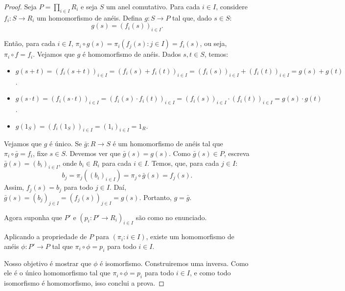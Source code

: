 \begin{proof}
    Seja $P=\prod_{i \in I}R_i$ e seja $S$ um anel comutativo. Para cada $i \in I$, considere $f_i:S\rightarrow R_i$ um homomorfismo de anéis.
    Defina $g:S\rightarrow P$ tal que, dado $s \in S$:
    \[g(s)=(f_i(s))_{i \in I}.\]

    Então, para cada $i \in I$, $\pi_i\circ g(s)=\pi_i(f_j(s): j \in I)=f_i(s)$, ou seja, $\pi_i\circ f=f_i$.
    Vejamos que $g$ é homomorfismo de anéis.
    Dados $s, t \in S$, temos:
    \begin{itemize}
        \item $g(s+t)=(f_i(s+t))_{i \in I}=(f_i(s)+f_i(t))_{i \in I}=(f_i(s))_{i \in I}+(f_i(t))_{i \in I}=g(s)+g(t)$.
        \item $g(s\cdot t)=(f_i(s\cdot t))_{i \in I}=(f_i(s)\cdot f_i(t))_{i \in I}=(f_i(s))_{i \in I}\cdot (f_i(t))_{i \in I}=g(s)\cdot g(t)$.
        \item $g(1_S)=(f_i(1_S))_{i \in I}=(1_i)_{i \in I}=1_R$.  
    \end{itemize}

    Vejamos que $g$ é único.
    Se $\bar g:R\rightarrow S$ é um homomorfismo de anéis tal que $\pi_i\circ \bar g=f_i$, fixe $s \in S$.
    Devemos ver que $\bar g(s)=g(s)$.
    Como $\bar g(s) \in P$, escreva $\bar g(s)=(b_i)_{i \in I}$, onde $b_i \in R_i$ para cada $i \in I$. Temos, que, para cada $j \in I$:
    \[b_j=\pi_j((b_i)_{i \in I})=\pi_j\circ \bar g(s)=f_j(s).\]
    Assim, $f_j(s)=b_j$ para todo $j \in I$. Daí, $\bar g(s)=(b_j)_{j \in I}=(f_j(s))_{j \in I}=g(s)$.
    Portanto, $g=\bar g$.

    Agora suponha que $P'$ e $(p_i:P'\rightarrow R_i)_{i \in I}$ são como no enunciado.

    Aplicando a propriedade de $P$ para $(\pi_i: i \in I)$, existe um homomorfismo de anéis $\phi: P'\rightarrow P$ tal que $\pi_i\circ \phi=p_i$ para todo $i \in I$.  

    \begin{figure}[H]
        \centering
    \end{figure}

    Nosso objetivo é mostrar que $\phi$ é isomorfismo. Construiremos uma inversa. Como ele é o único homomorfismo tal que $\pi_i\circ \phi=p_i$ para todo $i \in I$, e como todo isomorfismo é homomorfismo, isso conclui a prova.


\end{proof}

